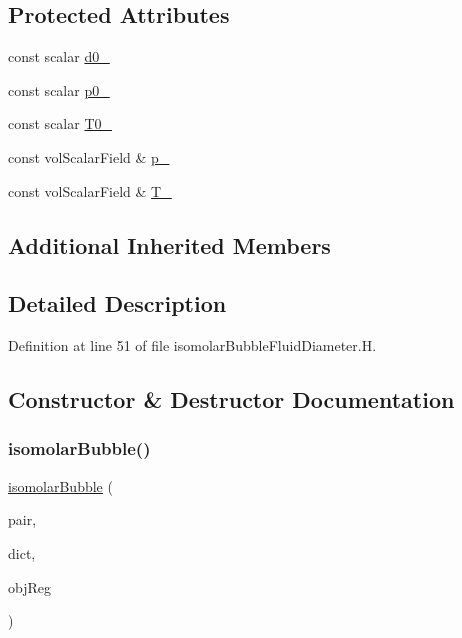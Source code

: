 \subsection*{Protected Attributes}
\begin{DoxyCompactItemize}
\item 
const scalar \hyperlink{classFoam_1_1fluidDiameterModels_1_1isomolarBubble_ac19e6215bb97f9383195d7ff5abeca69}{d0\+\_\+}
\item 
const scalar \hyperlink{classFoam_1_1fluidDiameterModels_1_1isomolarBubble_ab15fca9c1fbb6c6e34a4b5899cb9646e}{p0\+\_\+}
\item 
const scalar \hyperlink{classFoam_1_1fluidDiameterModels_1_1isomolarBubble_a032674446278a94719c4be7ef665caa2}{T0\+\_\+}
\item 
const vol\+Scalar\+Field \& \hyperlink{classFoam_1_1fluidDiameterModels_1_1isomolarBubble_a4c9ce31e482786bbeeed352570fd8d09}{p\+\_\+}
\item 
const vol\+Scalar\+Field \& \hyperlink{classFoam_1_1fluidDiameterModels_1_1isomolarBubble_ad77990330c1ea76d80703ca99150f7cc}{T\+\_\+}
\end{DoxyCompactItemize}
\subsection*{Additional Inherited Members}


\subsection{Detailed Description}


Definition at line 51 of file isomolar\+Bubble\+Fluid\+Diameter.\+H.



\subsection{Constructor \& Destructor Documentation}
\mbox{\label{classFoam_1_1fluidDiameterModels_1_1isomolarBubble_af7471925665a86607e5f6ef36bb9d05e}} 
\subsubsection{\texorpdfstring{isomolar\+Bubble()}{isomolarBubble()}}
{\footnotesize\ttfamily \hyperlink{classFoam_1_1fluidDiameterModels_1_1isomolarBubble}{isomolar\+Bubble} (\begin{DoxyParamCaption}\item[{const \hyperlink{classFoam_1_1FSPair}{F\+S\+Pair} \&}]{pair,  }\item[{const dictionary \&}]{dict,  }\item[{const object\+Registry \&}]{obj\+Reg }\end{DoxyParamCaption})}



